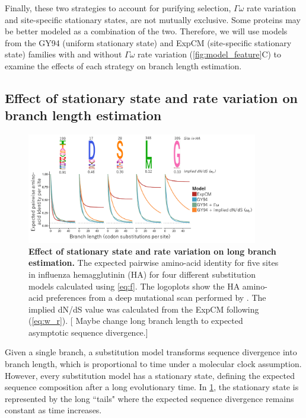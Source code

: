 \documentclass[11pt]{article}
\newcommand\skhcomment[1]{{\color{cyan}[#1]}}
\begin{document}
Finally, these two strategies to account for purifying selection, $\Gamma\omega$ rate variation and site-specific stationary states, are not mutually exclusive. 
Some proteins may be better modeled as a combination of the two. 
Therefore, we will use models from the GY94 (uniform stationary state) and ExpCM (site-specific stationary state) families with and without $\Gamma\omega$ rate variation (\ref{fig:model_feature}C) to examine the effects of each strategy on branch length estimation. 

\subsection*{Effect of stationary state and rate variation on branch length estimation}

\begin{figure}[H]
\centerline{\includegraphics[width=0.90\textwidth]{figures/decay.pdf}}
\caption{\label{fig:decay}
\textbf{Effect of stationary state and rate variation on long branch estimation.}
The expected pairwise amino-acid identity for five sites in influenza hemagglutinin (HA) for four different substitution models calculated using \ref{eq:f}. 
The logoplots show the HA amino-acid preferences from a deep mutational scan performed by \cite{doud2016accurate}. 
The implied dN/dS value was calculated from the ExpCM following \cite{spielman2015relationship} (\ref{eq:w_r}).
\skhcomment{ Maybe change long branch length to expected asymptotic sequence divergence.}
}
\end{figure}

Given a single branch, a substitution model transforms sequence divergence into branch length, which is proportional to time under a molecular clock assumption. 
However, every substitution model has a stationary state, defining the expected sequence composition after a long evolutionary time. 
In \ref{fig:decay}, the stationary state is represented by the long ``tails" where the expected sequence divergence remains constant as time increases. 
\end{document}
